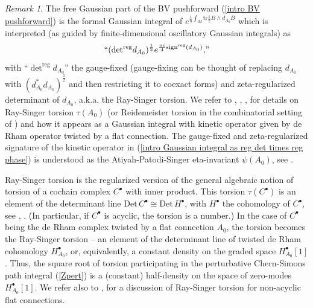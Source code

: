 \documentclass[11pt,a4paper]{amsart}
\theoremstyle{plain} %
\theoremstyle{definition}
\theoremstyle{remark}
\newtheorem{rem}[thm]{Remark}
\newcommand{\mr}{\mathrm}
\newcommand{\bt}{\bullet}
\newcommand{\mc}{\mathcal}
\begin{document}
\begin{rem}\label{rem: torsion in Gaussian integrals}
The free Gaussian part  of the BV pushforward (\ref{intro BV pushforward}) is 
the formal Gaussian integral of $e^{\frac{i}{\hbar} \int_M \mr{tr}\frac12 B\wedge d_{A_0} B}$ which is interpreted (as guided by finite-dimensional oscillatory Gaussian integrals) as 
\begin{equation}\label{intro Gaussian integral as reg det times reg phase}
``{({\det}^\mr{reg} d_{A_0})^\frac12 e^{\frac{\pi i}{4}\mr{sign}^\mr{reg}(d_{A_0})},}"
\end{equation}
with ``${\det}^\mr{reg} d_{A_0}$'' the gauge-fixed (gauge-fixing can be thought of replacing $d_{A_0}$ with $(d^*_{A_0}d_{A_0})^{\frac12}$ and then restricting it to coexact forms) and zeta-regularized determinant of $d_{A_0}$, a.k.a. the Ray-Singer torsion. We refer to \cite{Schwarz1978}, \cite{Witten1989}, \cite[Section 1.7]{mnev2014lecture}, \cite{cattaneo2020cellular} for details on Ray-Singer torsion $\tau(A_0)$ (or Reidemeister torsion in the combinatorial setting of \cite{cattaneo2020cellular}) and how it appears as a Gaussian integral with kinetic operator given by de Rham operator twisted by a flat connection. The gauge-fixed and zeta-regularized signature of the kinetic operator in (\ref{intro Gaussian integral as reg det times reg phase}) is understood as the Atiyah-Patodi-Singer eta-invariant $\psi(A_0)$, see \cite{Witten1989}.

Ray-Singer torsion is the regularized version of the general algebraic notion of torsion of a cochain complex $C^\bt$ with inner product. This torsion $\tau(C^\bt)$ is an element of the determinant line $\mr{Det}\,C^\bt \cong \mr{Det}\,H^\bt$, with $H^\bt$ the cohomology of $C^\bt$, see \cite{milnor1966whitehead}, \cite{mnev2014lecture}. (In particular, if $C^\bt$ is acyclic, the torsion is a number.) In the case of $C^\bt$ being the de Rham complex twisted by a flat connection $A_0$, the torsion becomes the Ray-Singer torsion -- an element of the determinant line of twisted de Rham cohomology $H^\bt_{A_0}$, or, equivalently, a constant density on the graded space $H^\bt_{A_0}[1]$. Thus, the square root of torsion participating in the perturbative Chern-Simons path integral (\ref{Zpert}) is a (constant) half-density on the space of zero-modes $H^\bt_{A_0}[1]$. We refer also to \cite{bismut1992extension}, \cite{braverman2003new} for a discussion of Ray-Singer torsion for non-acyclic flat connections.
\end{rem}
\end{document}
